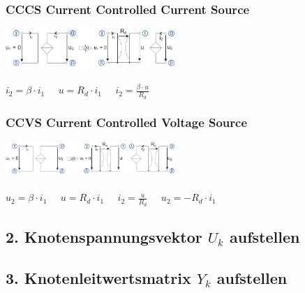 \documentclass[a4paper,twocolumn,10pt]{article}
\begin{document}
\subsubsection*{CCCS Current Controlled Current Source}
\includegraphics[width=0.48\textwidth]{Grafiken/KSA_ISI}\\\\
$i_2=\beta \cdot i_1\;\;\;\;\;u=R_d\cdot i_1\;\;\;\;\;i_2=\frac{\beta \cdot u}{R_d}$
\subsubsection*{CCVS Current Controlled Voltage Source}
\includegraphics[width=0.48\textwidth]{Grafiken/KSA_ISU}\\\\
$u_2=\beta \cdot i_1\;\;\;\;\;u=R_d\cdot i_1\;\;\;\;\;i_2=\frac{u}{R_d}\;\;\;\;\;u_2=-R_d\cdot i_1$

\subsection*{2. Knotenspannungsvektor $U_k$ aufstellen}
\subsection*{3. Knotenleitwertsmatrix $Y_k$ aufstellen}
\end{document}
